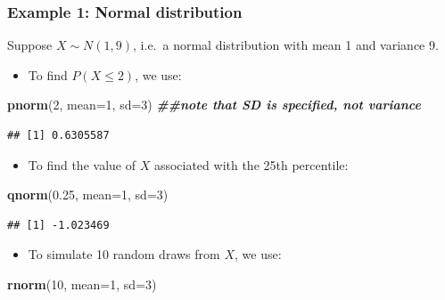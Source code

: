 \documentclass[
]{book}
\newenvironment{Shaded}{\begin{snugshade}}{\end{snugshade}}
\newcommand{\AttributeTok}[1]{\textcolor[rgb]{0.13,0.29,0.53}{#1}}
\newcommand{\DecValTok}[1]{\textcolor[rgb]{0.00,0.00,0.81}{#1}}
\newcommand{\DocumentationTok}[1]{\textcolor[rgb]{0.56,0.35,0.01}{\textbf{\textit{#1}}}}
\newcommand{\FloatTok}[1]{\textcolor[rgb]{0.00,0.00,0.81}{#1}}
\newcommand{\FunctionTok}[1]{\textcolor[rgb]{0.13,0.29,0.53}{\textbf{#1}}}
\newcommand{\NormalTok}[1]{#1}
\providecommand{\tightlist}{%
  \setlength{\itemsep}{0pt}\setlength{\parskip}{0pt}}
\theoremstyle{definition}
\theoremstyle{definition}
\theoremstyle{definition}
\theoremstyle{definition}
\theoremstyle{remark}
\begin{document}
\hypertarget{example-1-normal-distribution}{%
\subsubsection{Example 1: Normal distribution}\label{example-1-normal-distribution}}

Suppose \(X \sim N(1,9)\), i.e.~a normal distribution with mean 1 and variance 9.

\begin{itemize}
\tightlist
\item
  To find \(P(X \leq 2)\), we use:
\end{itemize}

\begin{Shaded}
\begin{Highlighting}[]
\FunctionTok{pnorm}\NormalTok{(}\DecValTok{2}\NormalTok{, }\AttributeTok{mean=}\DecValTok{1}\NormalTok{, }\AttributeTok{sd=}\DecValTok{3}\NormalTok{) }\DocumentationTok{\#\#note that SD is specified, not variance}
\end{Highlighting}
\end{Shaded}

\begin{verbatim}
## [1] 0.6305587
\end{verbatim}

\begin{itemize}
\tightlist
\item
  To find the value of \(X\) associated with the 25th percentile:
\end{itemize}

\begin{Shaded}
\begin{Highlighting}[]
\FunctionTok{qnorm}\NormalTok{(}\FloatTok{0.25}\NormalTok{, }\AttributeTok{mean=}\DecValTok{1}\NormalTok{, }\AttributeTok{sd=}\DecValTok{3}\NormalTok{)}
\end{Highlighting}
\end{Shaded}

\begin{verbatim}
## [1] -1.023469
\end{verbatim}

\begin{itemize}
\tightlist
\item
  To simulate 10 random draws from \(X\), we use:
\end{itemize}

\begin{Shaded}
\begin{Highlighting}[]
\FunctionTok{rnorm}\NormalTok{(}\DecValTok{10}\NormalTok{, }\AttributeTok{mean=}\DecValTok{1}\NormalTok{, }\AttributeTok{sd=}\DecValTok{3}\NormalTok{)}
\end{Highlighting}
\end{Shaded}
\end{document}
